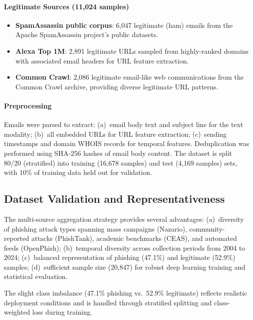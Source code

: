 \documentclass[conference]{IEEEtran}
\begin{document}
\paragraph{Legitimate Sources (11,024 samples)}
\begin{itemize}[leftmargin=*,itemsep=1pt]
  \item \textbf{SpamAssassin public corpus}: 6,047 legitimate (ham) emails
        from the Apache SpamAssassin project's public datasets.
  \item \textbf{Alexa Top 1M}: 2,891 legitimate URLs sampled from
        highly-ranked domains with associated email headers for URL feature
        extraction.
  \item \textbf{Common Crawl}: 2,086 legitimate email-like web communications
        from the Common Crawl archive, providing diverse legitimate URL
        patterns.
\end{itemize}

\paragraph{Preprocessing}
Emails were parsed to extract: (a)~email body text and subject line for the
text modality; (b)~all embedded URLs for URL feature extraction; (c)~sending
timestamps and domain WHOIS records for temporal features. Deduplication was
performed using SHA-256 hashes of email body content. The dataset is split
80/20 (stratified) into training (16,678 samples) and test (4,169 samples)
sets, with 10\% of training data held out for validation.

\subsection{Dataset Validation and Representativeness}
\label{subsec:dataset_validation}

The multi-source aggregation strategy provides several advantages:
(a)~diversity of phishing attack types spanning mass campaigns (Nazario),
community-reported attacks (PhishTank), academic benchmarks (CEAS), and
automated feeds (OpenPhish); (b)~temporal diversity across collection periods
from 2004 to 2024; (c)~balanced representation of phishing (47.1\%) and
legitimate (52.9\%) samples; (d)~sufficient sample size (20,847) for robust
deep learning training and statistical evaluation.

The slight class imbalance (47.1\% phishing vs.\ 52.9\% legitimate) reflects
realistic deployment conditions and is handled through stratified splitting
and class-weighted loss during training.
\end{document}
